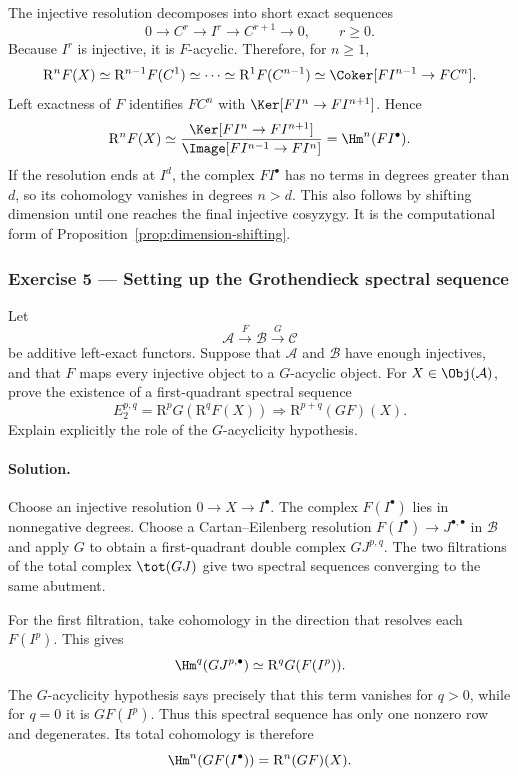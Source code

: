 The injective resolution decomposes into short exact sequences
\[
	0\to C^r\to I^r\to C^{r+1}\to0,
	\qquad r\geq0.
\]
Because $I^r$ is injective, it is $F$-acyclic. Therefore, for $n\geq1$,
\[
	\mathrm{R}^nF(X)\simeq\mathrm{R}^{n-1}F(C^1)\simeq\cdots
	\simeq\mathrm{R}^1F(C^{n-1})
	\simeq\Coker[FI^{n-1}\to FC^n].
\]
Left exactness of $F$ identifies $FC^n$ with
$\Ker[FI^n\to FI^{n+1}]$. Hence
\[
	\mathrm{R}^nF(X)\simeq
	\frac{\Ker[FI^n\to FI^{n+1}]}
	{\Image[FI^{n-1}\to FI^n]}
	=\Hm^n(FI^\bullet).
\]
If the resolution ends at $I^d$, the complex $FI^\bullet$ has no terms in
degrees greater than $d$, so its cohomology vanishes in degrees $n>d$. This
also follows by shifting dimension until one reaches the final injective
cosyzygy. It is the computational form of
Proposition~\ref{prop:dimension-shifting}.

\subsubsection*{Exercise 5 --- Setting up the Grothendieck spectral sequence}
\hypertarget{o014.mastery.derived-spectral.002.ex05}{ }
\label{mastery:derived-spectral-002-ex05}

Let
\[
	\mathcal{A}\xrightarrow{F}\mathcal{B}\xrightarrow{G}\mathcal{C}
\]
be additive left-exact functors. Suppose that $\mathcal{A}$ and
$\mathcal{B}$ have enough injectives, and that $F$ maps every injective
object to a $G$-acyclic object. For $X\in\Obj(\mathcal{A})$, prove the
existence of a first-quadrant spectral sequence
\[
	E_2^{p,q}=\mathrm{R}^pG(\mathrm{R}^qF(X))
	\Rightarrow\mathrm{R}^{p+q}(GF)(X).
\]
Explain explicitly the role of the $G$-acyclicity hypothesis.

\paragraph{Solution.}
\hypertarget{o014.mastery.derived-spectral.002.sol05}{ }
Choose an injective resolution $0\to X\to I^\bullet$. The complex
$F(I^\bullet)$ lies in nonnegative degrees. Choose a Cartan--Eilenberg
resolution $F(I^\bullet)\to J^{\bullet,\bullet}$ in $\mathcal{B}$ and
apply $G$ to obtain a first-quadrant double complex $GJ^{p,q}$. The two
filtrations of the total complex $\tot(GJ)$ give two spectral sequences
converging to the same abutment.

For the first filtration, take cohomology in the direction that resolves
each $F(I^p)$. This gives
\[
	\Hm^q(GJ^{p,\bullet})
	\simeq\mathrm{R}^qG(F(I^p)).
\]
The $G$-acyclicity hypothesis says precisely that this term vanishes for
$q>0$, while for $q=0$ it is $GF(I^p)$. Thus this spectral sequence has
only one nonzero row and degenerates. Its total cohomology is therefore
\[
	\Hm^n(GF(I^\bullet))=\mathrm{R}^n(GF)(X).
\]

